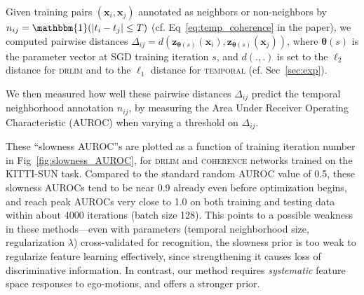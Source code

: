 \documentclass[10pt,twocolumn,letterpaper]{article}
\begin{document}
Given training pairs $(\bm{x}_i,\bm{x}_j)$ annotated as neighbors or non-neighbors by $n_{ij}=\mathbbm{1}(|t_i-t_j|\leq T)$ (cf. Eq~\eqref{eq:temp_coherence} in the paper), we computed pairwise distances $\Delta_{ij}=d(\mathbf{z}_{\bm{\theta}(s)}(\bm{x}_i), \mathbf{z}_{\bm{\theta}(s)}(\bm{x}_j))$, where $\bm{\theta}(s)$ is the parameter vector at SGD training iteration $s$, and $d(.,.)$ is set to the $\ell_2$ distance for \textsc{drlim} and to the $\ell_1$ distance for \textsc{temporal} (cf. Sec~\ref{sec:exp}).

We then measured how well these pairwise distances $\Delta_{ij}$ predict the temporal neighborhood annotation $n_{ij}$, by measuring the Area Under Receiver Operating Characteristic (AUROC) when varying a threshold on $\Delta_{ij}$.

These ``slowness AUROC''s are plotted as a function of training iteration number in Fig~\ref{fig:slowness_AUROC}, for \textsc{drlim} and \textsc{coherence} networks trained on the KITTI-SUN task. Compared to the standard random AUROC value of 0.5, these slowness AUROCs tend to be near 0.9 already even before optimization begins, and reach peak AUROCs very close to 1.0 on both training and testing data within about 4000 iterations (batch size 128). This points to a possible weakness in these methods---even with parameters (temporal neighborhood size, regularization $\lambda$) cross-validated for recognition, the slowness prior is too weak to regularize feature learning effectively, since strengthening it causes loss of discriminative information. In contrast, our method requires \emph{systematic} feature space responses to ego-motions, and offers a stronger prior.
\end{document}
